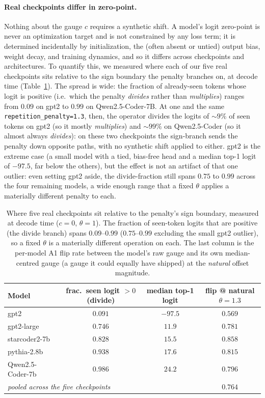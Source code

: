 \documentclass[11pt]{article}
\newcommand{\thp}{\theta}
\newcommand{\code}[1]{\texttt{#1}}
\begin{document}
\paragraph{Real checkpoints differ in zero-point.} Nothing about the gauge $c$
requires a synthetic shift. A model's logit zero-point is never an optimization target and is
not constrained by any loss term; it is determined incidentally by initialization, the (often
absent or untied) output bias, weight decay, and training dynamics, and so it differs across
checkpoints and architectures. To quantify this, we
measured where each of our five real checkpoints sits relative to the sign boundary
the penalty branches on, at decode time (Table~\ref{tab:zeropoint}). The spread is wide:
the fraction of already-seen tokens whose logit is positive (i.e.\ which the penalty
\emph{divides} rather than \emph{multiplies}) ranges from $0.09$ on gpt2 to $0.99$ on
Qwen2.5-Coder-7B. At one and the same \code{repetition\_penalty=1.3}, then, the operator
divides the logits of $\sim$$9\%$ of seen tokens on gpt2 (so it mostly \emph{multiplies}) and
$\sim$$99\%$ on Qwen2.5-Coder (so it almost always \emph{divides}): on these two checkpoints
the sign-branch sends the penalty down opposite paths, with no synthetic shift
applied to either. gpt2 is the extreme case (a small model with a tied, bias-free head and a
median top-1 logit of $-97.5$, far below the others), but the effect is not an artifact of that
one outlier: even setting gpt2 aside, the divide-fraction still spans $0.75$ to $0.99$ across
the four remaining models, a wide enough range that a fixed $\thp$ applies a materially
different penalty to each.

\begin{table}[t]
\centering
\caption{Where five real checkpoints sit relative to the penalty's sign boundary, measured at
decode time ($c=0$, $\thp=1$). The fraction of seen-token logits that are positive (the
divide branch) spans $0.09$--$0.99$ ($0.75$--$0.99$ excluding the small gpt2 outlier), so a
fixed $\thp$ is a materially different operation on each. The last column is the per-model A1
flip rate between the model's raw gauge and its own median-centred gauge (a gauge it could
equally have shipped) at the \emph{natural} offset magnitude.}
\label{tab:zeropoint}
\begin{tabular}{lccc}
\toprule
Model & frac.\ seen logit $>0$ (divide) & median top-1 logit & flip @ natural $\thp{=}1.3$ \\
\midrule
gpt2              & $0.091$ & $-97.5$ & $0.569$ \\
gpt2-large        & $0.746$ & $11.9$  & $0.781$ \\
starcoder2-7b     & $0.828$ & $15.5$  & $0.858$ \\
pythia-2.8b       & $0.938$ & $17.6$  & $0.815$ \\
Qwen2.5-Coder-7b  & $0.986$ & $24.2$  & $0.796$ \\
\midrule
\multicolumn{3}{l}{\emph{pooled across the five checkpoints}} & $0.764$ \\
\bottomrule
\end{tabular}
\end{table}
\end{document}

